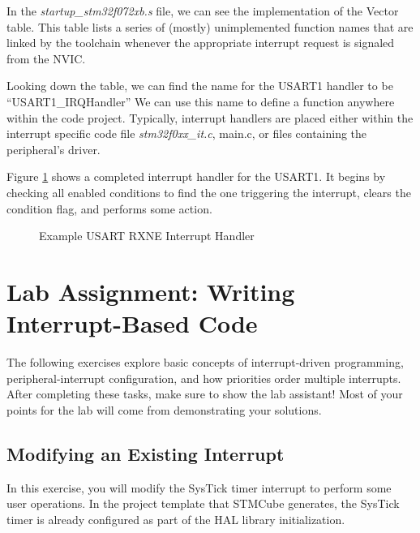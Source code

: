 \documentclass[11pt,fleqn]{book} %
\newcommand{\code}[3]{
    \begin{figure}[]
        \colorbox{gray!20!white}{
            \parbox{\linewidth-2\fboxsep} {
                \centering 
                
            }
        }
        \caption{#2}
        \label{#3}
    \end{figure}
}
\begin{document}
\begin{example}
    In the \textit{startup\_stm32f072xb.s} file, we can see the implementation of the Vector table. This table lists a series of (mostly) unimplemented function names that are linked by the toolchain whenever the appropriate interrupt request is signaled from the NVIC. 
    
    Looking down the table, we can find the name for the USART1 handler to be ``USART1\_IRQHandler'' We can use this name to define a function anywhere within the code project. Typically, interrupt handlers are placed either within the interrupt specific code file \textit{stm32f0xx\_it.c}, main.c, or files containing the peripheral's driver.  
    
    Figure \ref{usart_isr} shows a completed interrupt handler for the USART1. It begins by checking all enabled conditions to find the one triggering the interrupt, clears the condition flag, and performs some action. 
    
    \code{./Files/usart_isr.c}{Example USART RXNE Interrupt Handler}{usart_isr}
    
\end{example}




\section{Lab Assignment: Writing Interrupt-Based Code}
The following exercises explore basic concepts of interrupt-driven programming, peripheral-interrupt configuration, and how priorities order multiple interrupts. After completing these tasks, make sure to show the lab assistant! Most of your points for the lab will come from demonstrating your solutions.

\subsection{Modifying an Existing Interrupt}
In this exercise, you will modify the SysTick timer interrupt to perform some user operations. In the project template that STMCube generates, the SysTick timer is already configured as part of the HAL library initialization. 
\end{document}

